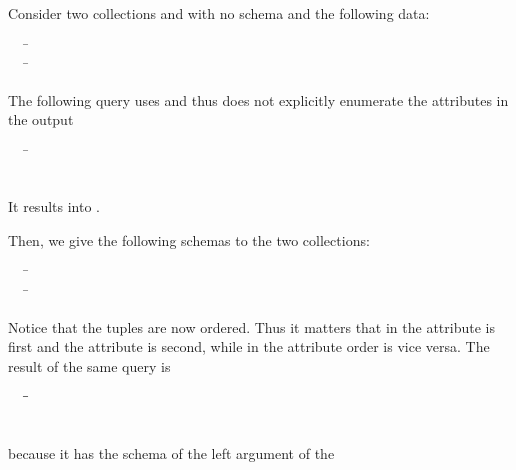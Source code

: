 {\begin{example}
Consider two collections  and  with no schema and the following
data:
\begin{tabbing}
\ \ \ \=\\
\ \ \ \=
\end{tabbing}
The following query uses \gl{*} and thus does not explicitly enumerate the
attributes in the output
\begin{tabbing}
\ \ \ \=\\
\>\\
\>
\end{tabbing} 
\noindent It results into .

Then, we give the following schemas to the two collections:
\begin{tabbing}
\ \ \ \=\\
\ \ \ \=
\end{tabbing}
Notice that the tuples are now ordered. Thus it matters that in  the
attribute  is first and the attribute  is second, while in 
the attribute order is vice versa. The result of the same  query is
\begin{tabbing}
\ \ \ \=\gl{\ob }\=\\
\ \ \ \>\>
\end{tabbing}
\noindent because it has the schema of the left argument of the  
\end{example}

}
















